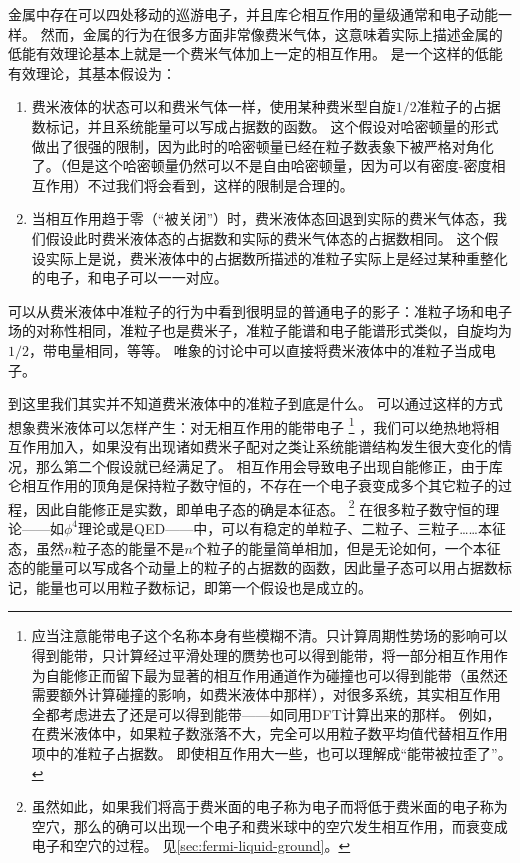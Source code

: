金属中存在可以四处移动的巡游电子，并且库仑相互作用的量级通常和电子动能一样。
然而，金属的行为在很多方面非常像费米气体，这意味着实际上描述金属的低能有效理论基本上就是一个费米气体加上一定的相互作用。
是一个这样的低能有效理论，其基本假设为：
\begin{enumerate}
    \item 费米液体的状态可以和费米气体一样，使用某种费米型自旋$1/2$准粒子的占据数标记，并且系统能量可以写成占据数的函数。
    这个假设对哈密顿量的形式做出了很强的限制，因为此时的哈密顿量已经在粒子数表象下被严格对角化了。（但是这个哈密顿量仍然可以不是自由哈密顿量，因为可以有密度-密度相互作用）不过我们将会看到，这样的限制是合理的。
    \item 当相互作用趋于零（“被关闭”）时，费米液体态回退到实际的费米气体态，我们假设此时费米液体态的占据数和实际的费米气体态的占据数相同。
    这个假设实际上是说，费米液体中的占据数所描述的准粒子实际上是经过某种重整化的电子，和电子可以一一对应。
\end{enumerate}

可以从费米液体中准粒子的行为中看到很明显的普通电子的影子：准粒子场和电子场的对称性相同，准粒子也是费米子，准粒子能谱和电子能谱形式类似，自旋均为$1/2$，带电量相同，等等。
唯象的讨论中可以直接将费米液体中的准粒子当成电子。

到这里我们其实并不知道费米液体中的准粒子到底是什么。
可以通过这样的方式想象费米液体可以怎样产生：对无相互作用的能带电子%
\footnote{
    应当注意能带电子这个名称本身有些模糊不清。只计算周期性势场的影响可以得到能带，只计算经过平滑处理的赝势也可以得到能带，将一部分相互作用作为自能修正而留下最为显著的相互作用通道作为碰撞也可以得到能带（虽然还需要额外计算碰撞的影响，如费米液体中那样），对很多系统，其实相互作用全都考虑进去了还是可以得到能带——如同用DFT计算出来的那样。
    例如，在费米液体中，如果粒子数涨落不大，完全可以用粒子数平均值代替相互作用项中的准粒子占据数。
    即使相互作用大一些，也可以理解成“能带被拉歪了”。
}%
，我们可以绝热地将相互作用加入，如果没有出现诸如费米子配对之类让系统能谱结构发生很大变化的情况，那么第二个假设就已经满足了。
相互作用会导致电子出现自能修正，由于库仑相互作用的顶角是保持粒子数守恒的，不存在一个电子衰变成多个其它粒子的过程，因此自能修正是实数，即单电子态的确是本征态。%
\footnote{
    虽然如此，如果我们将高于费米面的电子称为电子而将低于费米面的电子称为空穴，那么的确可以出现一个电子和费米球中的空穴发生相互作用，而衰变成电子和空穴的过程。
    见\autoref{sec:fermi-liquid-ground}。
}%
在很多粒子数守恒的理论——如$\phi^4$理论或是QED——中，可以有稳定的单粒子、二粒子、三粒子……本征态，虽然$n$粒子态的能量不是$n$个粒子的能量简单相加，但是无论如何，一个本征态的能量可以写成各个动量上的粒子的占据数的函数，因此量子态可以用占据数标记，能量也可以用粒子数标记，即第一个假设也是成立的。

